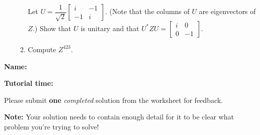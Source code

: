 \documentclass[12pt]{article}
\newcommand{\bbm}{\begin{bmatrix}}
\newcommand{\ebm}{\end{bmatrix}}
\begin{document}
\begin{enumerate}
\begin{enumerate}
Let $U = \dfrac{1}{\sqrt{2}}\bbm i&-1\\-1&i\ebm$. (Note that the columns of $U$ are eigenvectors of $Z$.) Show that $U$ is unitary and that $U^*ZU = \bbm i&0\\0&-1\ebm$.
\item Compute $Z^{423}$.
\end{enumerate}
 \end{enumerate}
\newpage

{\large \bf Name:}

\vspace{24pt}

{\large \bf Tutorial time:}

\vspace{24pt}

Please submit \textbf{one} \textit{completed} solution from the worksheet for feedback. 

\textbf{Note:} Your solution needs to contain enough detail for it to be clear what problem you're trying to solve!
\end{document}

